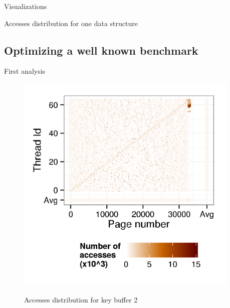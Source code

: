 \documentclass[xcolor={usenames,dvipsnames},hyperref={pdfusetitle}]{beamer}
\begin{document}
\begin{frame}{Visualizations}
{{            \begin{block}{}
                \centering
                Accesses distribution for one data structure
            \end{block}
        }
    }
    \pause
    \pause
\end{frame}

\subsection{Optimizing a well known benchmark}

\begin{frame}{First analysis}
\begin{figure}[htb]
    \begin{columns}
        \begin{column}{.45\linewidth}
            \includegraphics[width=\linewidth]  {tabarnac/is_b_kb2_orig}
            \begin{block}{}
                \centering
                Accesses distribution for key buffer 2
            \end{block}
        \end{column}
        \begin{column}{.45\linewidth}

\end{column}
\end{columns}
\end{figure}
\end{frame}
\end{document}
